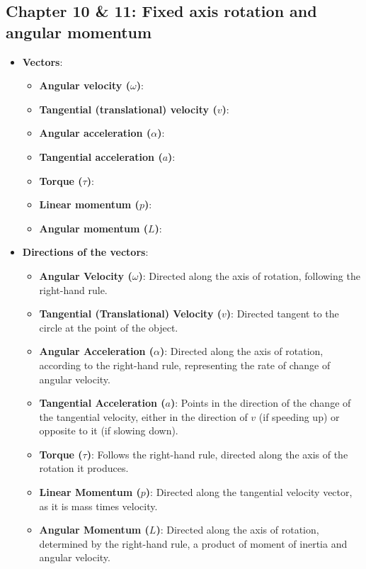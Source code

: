 \documentclass{report}
\begin{document}
    \pagebreak 
    \subsection{Chapter 10 \& 11: Fixed axis rotation and angular momentum}
    \begin{itemize}
        \item \textbf{Vectors}:
            \begin{itemize}
                \item \textbf{Angular velocity ($\omega$)}:
                \item \textbf{Tangential (translational) velocity ($v$)}:
                \item \textbf{Angular acceleration ($\alpha$)}:
                \item \textbf{Tangential acceleration ($a$)}:
                \item \textbf{Torque ($\tau$)}:
                \item \textbf{Linear momentum ($p$)}:
                \item \textbf{Angular momentum ($L$)}:
            \end{itemize}
        \item \textbf{Directions of the vectors}:
            \begin{itemize}
                \item \textbf{Angular Velocity (\(\omega\))}: Directed along the axis of rotation, following the right-hand rule.
                \item \textbf{Tangential (Translational) Velocity (\(v\))}: Directed tangent to the circle at the point of the object.
                \item \textbf{Angular Acceleration (\(\alpha\))}: Directed along the axis of rotation, according to the right-hand rule, representing the rate of change of angular velocity.
                \item \textbf{Tangential Acceleration (\(a\))}: Points in the direction of the change of the tangential velocity, either in the direction of \(v\) (if speeding up) or opposite to it (if slowing down).
                \item \textbf{Torque (\(\tau\))}: Follows the right-hand rule, directed along the axis of the rotation it produces.
                \item \textbf{Linear Momentum (\(p\))}: Directed along the tangential velocity vector, as it is mass times velocity.
                \item \textbf{Angular Momentum (\(L\))}: Directed along the axis of rotation, determined by the right-hand rule, a product of moment of inertia and angular velocity.

\end{itemize}
\end{itemize}
\end{document}
